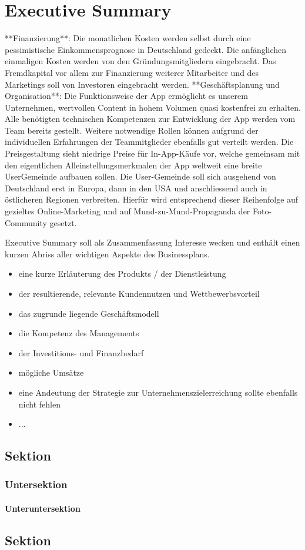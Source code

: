 \chapter{Executive Summary}



**Finanzierung**: Die monatlichen Kosten werden selbst durch eine pessimistische Einkommensprognose in Deutschland gedeckt. Die anfänglichen einmaligen Kosten werden von den Gründungsmitgliedern eingebracht. Das Fremdkapital vor allem zur Finanzierung weiterer Mitarbeiter und des Marketings soll von Investoren eingebracht werden.
**Geschäftsplanung und Organisation**: Die Funktionsweise der App ermöglicht es unserem Unternehmen, wertvollen Content in hohem Volumen quasi kostenfrei zu erhalten. Alle benötigten technischen Kompetenzen zur Entwicklung der App werden vom Team bereits gestellt. Weitere notwendige Rollen können aufgrund der individuellen Erfahrungen der Teammitglieder ebenfalls gut verteilt werden.
Die Preisgestaltung sieht niedrige Preise für In-App-Käufe vor, welche gemeinsam mit den eigentlichen Alleinstellungsmerkmalen der App weltweit eine breite UserGemeinde aufbauen sollen. Die User-Gemeinde soll sich ausgehend von Deutschland erst in Europa, dann in den USA und anschliessend auch in östlicheren Regionen verbreiten. Hierfür wird entsprechend dieser Reihenfolge auf gezieltes Online-Marketing und auf Mund-zu-Mund-Propaganda der Foto-Community gesetzt.



Executive Summary soll als Zusammenfassung Interesse wecken und enthält einen kurzen Abriss aller wichtigen Aspekte des Businessplans.
\begin{itemize}
\item eine kurze Erläuterung des Produkts / der Dienstleistung
\item der resultierende, relevante Kundennutzen und Wettbewerbsvorteil
\item das zugrunde liegende Geschäftsmodell
\item die Kompetenz des Managements
\item der Investitions- und Finanzbedarf
\item mögliche Umsätze
\item eine Andeutung der Strategie zur Unternehmenszielerreichung sollte ebenfalls nicht fehlen
\item ...
\end{itemize}

\section{Sektion}

\subsection{Untersektion}

\subsubsection{Unteruntersektion}

\section{Sektion}


